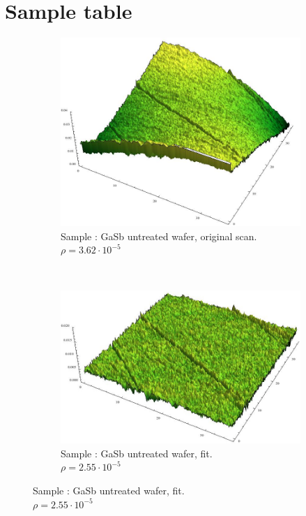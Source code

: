 \section{Sample table}

\label{samples}
\begin{figure}
    \vspace{-2em}
    \centering
     \begin{subfigure}{0.4\columnwidth}
         \includegraphics[width=\textwidth]{Bilder/s1_raw_orig.jpg}
         \caption{Sample : GaSb untreated wafer, original scan.  
         $\rho = 3.62 \cdot 10^{-5}$}
        \label{s1_orig}
    \end{subfigure}
    ~
    \begin{subfigure}{0.4\columnwidth}
         \includegraphics[width=\textwidth]{Bilder/s1_raw_f.jpg}
         \caption{Sample : GaSb untreated wafer, fit.\\  $\rho = 2.55 
         \cdot 10^{-5}$}
        \label{s1_flat}
    \end{subfigure}


\end{figure}

